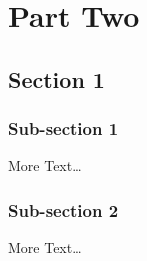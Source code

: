 
\chapter{Part Two}

\section{Section 1}


\subsection{Sub-section 1}
More Text\ldots

\subsection{Sub-section 2}
More Text\ldots

